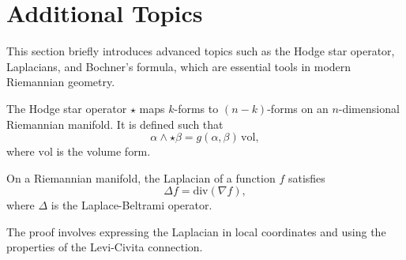 \section{Additional Topics}
This section briefly introduces advanced topics such as the Hodge star operator, Laplacians, and Bochner's formula, which are essential tools in modern Riemannian geometry.

\begin{deff}
The Hodge star operator \( \star \) maps \( k \)-forms to \( (n-k) \)-forms on an \( n \)-dimensional Riemannian manifold. It is defined such that
\[
\alpha \wedge \star \beta = g(\alpha, \beta) \, \mathrm{vol},
\]
where \( \mathrm{vol} \) is the volume form.
\end{deff}

\begin{teorema}
On a Riemannian manifold, the Laplacian of a function \( f \) satisfies
\[
\Delta f = \text{div}(\nabla f),
\]
where \( \Delta \) is the Laplace-Beltrami operator.
\end{teorema}

\begin{demm}
The proof involves expressing the Laplacian in local coordinates and using the properties of the Levi-Civita connection.
\end{demm}